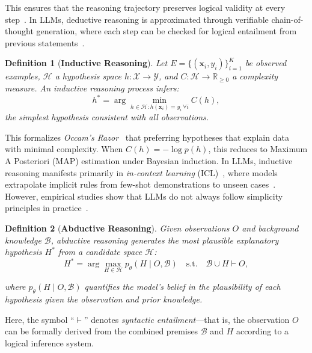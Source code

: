 \documentclass[11pt]{article}
\newtheorem{definition}{Definition}[section]
\begin{document}
This ensures that the reasoning trajectory preserves logical validity 
at every step~\citep{ling2023deductive}. In LLMs, deductive reasoning 
is approximated through verifiable chain-of-thought generation, where 
each step can be checked for logical entailment from previous 
statements~\citep{ling2023deductive,SealsShalin2024Deductive,Xia2025FormalLogic}.



\begin{definition}[\textbf{Inductive Reasoning}]
\label{def:inductive}
Let $E = \{(\mathbf{x}_i, y_i)\}_{i=1}^K$ be observed examples, 
$\mathcal{H}$ a hypothesis space $h: \mathcal{X} \to \mathcal{Y}$,
and $C: \mathcal{H} \to \mathbb{R}_{\ge0}$ a complexity measure. 
An inductive reasoning process infers:
\begin{equation}
\label{eq:inductive}
h^* = \arg\min_{h \in \mathcal{H} : h(\mathbf{x}_i)=y_i \,\forall i} C(h),
\end{equation}
the simplest hypothesis consistent with all observations.
\end{definition}

This formalizes \emph{Occam's Razor}~\citep{Baker2022-BAKSSE-2} that preferring 
hypotheses that explain data with minimal complexity. 
When $C(h) = -\log p(h)$, this reduces to Maximum A Posteriori (MAP) 
estimation under Bayesian induction.
In LLMs, inductive reasoning manifests primarily in \emph{in-context 
learning} (ICL)~\citep{brown2020language}, where models extrapolate implicit 
rules from few-shot demonstrations to unseen cases~\citep{Ye2025ICLAttribution}.
However, empirical studies show that LLMs do not always follow simplicity 
principles in practice~\citep{SunSaparov2025Occam}.


\begin{definition}[\textbf{Abductive Reasoning}]
\label{def:abductive}
Given observations $O$ and background knowledge $\mathcal{B}$,
abductive reasoning generates the most plausible explanatory 
hypothesis $H^*$ from a candidate space $\mathcal{H}$:
\begin{equation}
\label{eq:abductive}
H^{*} = \arg\max_{H \in \mathcal{H}} p_\theta(H \mid O, \mathcal{B})
\quad\text{s.t.}\quad \mathcal{B} \cup H \vdash O,
\end{equation}

where $p_\theta(H \mid O, \mathcal{B})$ quantifies the model's belief in the plausibility 
of each hypothesis given the observation and prior knowledge. \end{definition}
Here, the symbol ``$\vdash$'' denotes \emph{syntactic entailment}---that is, 
the observation $O$ can be formally derived from the combined premises 
$\mathcal{B}$ and $H$ according to a logical inference system.
\end{document}
